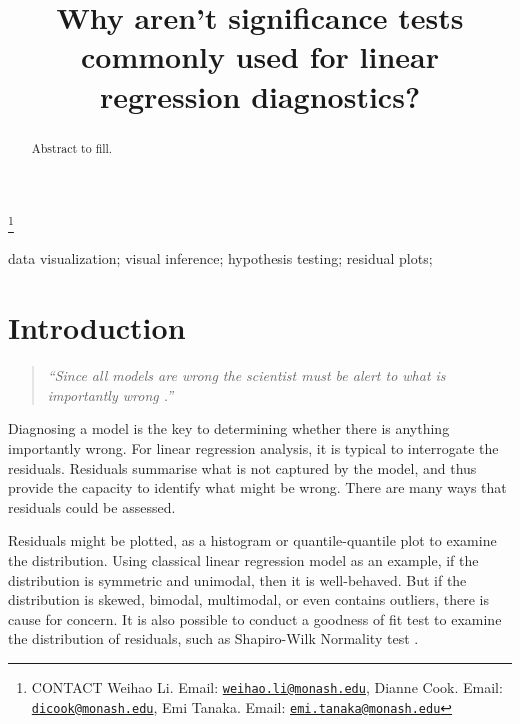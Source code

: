 \documentclass[]{interact}
\theoremstyle{plain}%
\theoremstyle{definition}
\theoremstyle{remark}
\begin{document}

\title{Why aren't significance tests commonly used for linear regression
diagnostics?}


\author{
}

\thanks{CONTACT Weihao
Li. Email: \href{mailto:weihao.li@monash.edu}{\nolinkurl{weihao.li@monash.edu}}, Dianne
Cook. Email: \href{mailto:dicook@monash.edu}{\nolinkurl{dicook@monash.edu}}, Emi
Tanaka. Email: \href{mailto:emi.tanaka@monash.edu}{\nolinkurl{emi.tanaka@monash.edu}}}

\maketitle

\begin{abstract}
Abstract to fill.
\end{abstract}

\begin{keywords}
data visualization; visual inference; hypothesis testing; residual
plots;
\end{keywords}

\hypertarget{introduction}{%
\section{Introduction}\label{introduction}}

\begin{quote}
\emph{``Since all models are wrong the scientist must be alert to what
is importantly wrong \citep{box1976science}.''}
\end{quote}

Diagnosing a model is the key to determining whether there is anything
importantly wrong. For linear regression analysis, it is typical to
interrogate the residuals. Residuals summarise what is not captured by
the model, and thus provide the capacity to identify what might be
wrong. There are many ways that residuals could be assessed.

Residuals might be plotted, as a histogram or quantile-quantile plot to
examine the distribution. Using classical linear regression model as an
example, if the distribution is symmetric and unimodal, then it is
well-behaved. But if the distribution is skewed, bimodal, multimodal, or
even contains outliers, there is cause for concern. It is also possible
to conduct a goodness of fit test to examine the distribution of
residuals, such as Shapiro-Wilk Normality test
\citep{shapiro1965analysis}.
\end{document}
